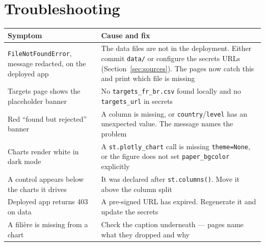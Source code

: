 \documentclass[11pt,a4paper]{article}
\newcommand{\file}[1]{\texttt{#1}}
\begin{document}
\section{Troubleshooting}

\begin{longtable}{@{}L{5.4cm}L{9.0cm}@{}}
\toprule
\textbf{Symptom} & \textbf{Cause and fix} \\
\midrule
\endhead
\file{FileNotFoundError}, message redacted, on the deployed app &
The data files are not in the deployment. Either commit \file{data/} or
configure the secrets URLs (Section~\ref{sec:sources}). The pages now catch this
and print which file is missing \\
\addlinespace
Targets page shows the placeholder banner &
No \file{targets\_fr\_br.csv} found locally and no \file{targets\_url} in
secrets \\
\addlinespace
Red ``found but rejected'' banner &
A column is missing, or \file{country}/\file{level} has an unexpected value.
The message names the problem \\
\addlinespace
Charts render white in dark mode &
A \file{st.plotly\_chart} call is missing \file{theme=None}, or the figure does
not set \file{paper\_bgcolor} explicitly \\
\addlinespace
A control appears below the charts it drives &
It was declared after \file{st.columns()}. Move it above the column split \\
\addlinespace
Deployed app returns 403 on data &
A pre-signed URL has expired. Regenerate it and update the secrets \\
\addlinespace
A filière is missing from a chart &
Check the caption underneath --- pages name what they dropped and why \\
\bottomrule
\end{longtable}
\end{document}
